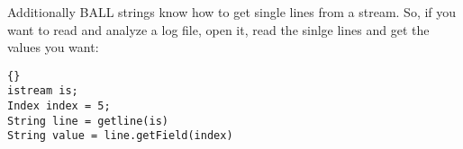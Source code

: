 Additionally BALL strings know how to get single lines from a stream. So, if
you want to read and analyze a log file, open it, read the sinlge lines and
get the values you want:
\begin{lstlisting}{}
istream is;
Index index = 5;
String line = getline(is)
String value = line.getField(index)
\end{lstlisting}{}
